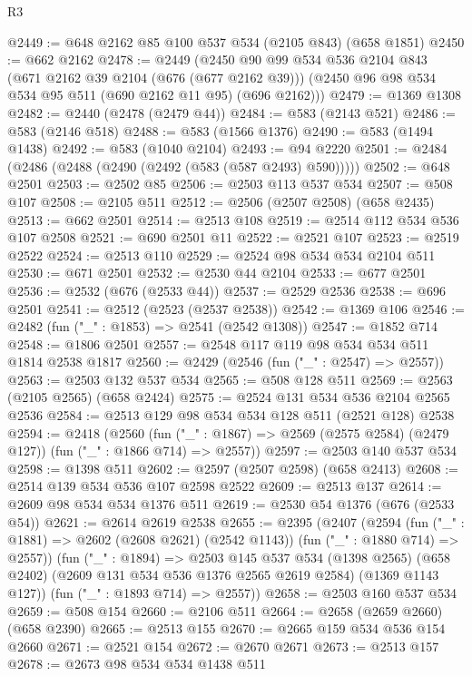 \begin{lexlean}{R3}
\begin{coremodule}
@2449 := @648 @2162 @85 @100 @537 @534 (@2105 @843) (@658 @1851)
@2450 := @662 @2162
@2478 := @2449
    (@2450
      @90
      @99
      @534
      @536
      @2104
      @843
      (@671 @2162 @39 @2104 (@676 (@677 @2162 @39)))
      (@2450 @96 @98 @534 @534 @95 @511 (@690 @2162 @11 @95) (@696 @2162)))
@2479 := @1369 @1308
@2482 := @2440 (@2478 (@2479 @44))
@2484 := @583 (@2143 @521)
@2486 := @583 (@2146 @518)
@2488 := @583 (@1566 @1376)
@2490 := @583 (@1494 @1438)
@2492 := @583 (@1040 @2104)
@2493 := @94 @2220
@2501 := @2484 (@2486 (@2488 (@2490 (@2492 (@583 (@587 @2493) @590)))))
@2502 := @648 @2501
@2503 := @2502 @85
@2506 := @2503 @113 @537 @534
@2507 := @508 @107
@2508 := @2105 @511
@2512 := @2506 (@2507 @2508) (@658 @2435)
@2513 := @662 @2501
@2514 := @2513 @108
@2519 := @2514 @112 @534 @536 @107 @2508
@2521 := @690 @2501 @11
@2522 := @2521 @107
@2523 := @2519 @2522
@2524 := @2513 @110
@2529 := @2524 @98 @534 @534 @2104 @511
@2530 := @671 @2501
@2532 := @2530 @44 @2104
@2533 := @677 @2501
@2536 := @2532 (@676 (@2533 @44))
@2537 := @2529 @2536
@2538 := @696 @2501
@2541 := @2512 (@2523 (@2537 @2538))
@2542 := @1369 @106
@2546 := @2482 (fun ("_" : @1853) => @2541 (@2542 @1308))
@2547 := @1852 @714
@2548 := @1806 @2501
@2557 := @2548 @117 @119 @98 @534 @534 @511 @1814 @2538 @1817
@2560 := @2429 (@2546 (fun ("_" : @2547) => @2557))
@2563 := @2503 @132 @537 @534
@2565 := @508 @128 @511
@2569 := @2563 (@2105 @2565) (@658 @2424)
@2575 := @2524 @131 @534 @536 @2104 @2565 @2536
@2584 := @2513 @129 @98 @534 @534 @128 @511 (@2521 @128) @2538
@2594 := @2418
    (@2560
      (fun ("_" : @1867) => @2569 (@2575 @2584) (@2479 @127))
      (fun ("_" : @1866 @714) => @2557))
@2597 := @2503 @140 @537 @534
@2598 := @1398 @511
@2602 := @2597 (@2507 @2598) (@658 @2413)
@2608 := @2514 @139 @534 @536 @107 @2598 @2522
@2609 := @2513 @137
@2614 := @2609 @98 @534 @534 @1376 @511
@2619 := @2530 @54 @1376 (@676 (@2533 @54))
@2621 := @2614 @2619 @2538
@2655 := @2395
    (@2407
      (@2594
        (fun ("_" : @1881) => @2602 (@2608 @2621) (@2542 @1143))
        (fun ("_" : @1880 @714) => @2557))
      (fun ("_" : @1894) =>
      @2503
        @145
        @537
        @534
        (@1398 @2565)
        (@658 @2402)
        (@2609 @131 @534 @536 @1376 @2565 @2619 @2584)
        (@1369 @1143 @127))
      (fun ("_" : @1893 @714) => @2557))
@2658 := @2503 @160 @537 @534
@2659 := @508 @154
@2660 := @2106 @511
@2664 := @2658 (@2659 @2660) (@658 @2390)
@2665 := @2513 @155
@2670 := @2665 @159 @534 @536 @154 @2660
@2671 := @2521 @154
@2672 := @2670 @2671
@2673 := @2513 @157
@2678 := @2673 @98 @534 @534 @1438 @511

\end{coremodule}
\end{lexlean}

